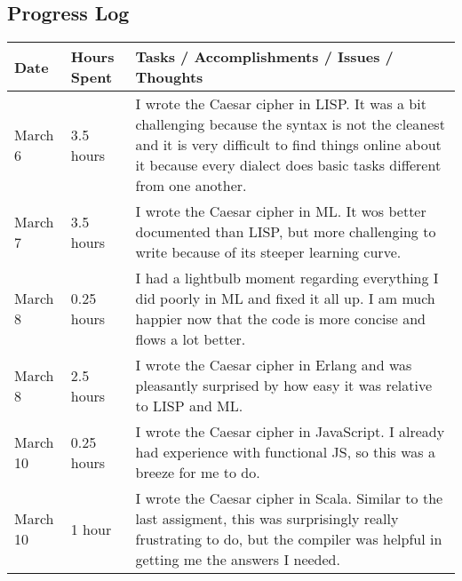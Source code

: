 \documentclass[letterpaper, 10pt, DIV=13]{scrartcl}
\numberwithin{equation}{section}
\numberwithin{figure}{section}
\numberwithin{table}{section}
\begin{document}
\subsection{Progress Log}
\begin{center}
	\begin{longtable}{|p{1in}|p{1in}|p{4in}|}
		\hline
		Date & Hours Spent & Tasks / Accomplishments / Issues / Thoughts
		\\
		\hline
        March 6 & 3.5 hours & I wrote the Caesar cipher in LISP. It was a bit challenging because the syntax is not the cleanest and it is very 
        difficult to find things online about it because every dialect does basic tasks different from one another.
        \\
		\hline
        March 7 & 3.5 hours & I wrote the Caesar cipher in ML. It wos better documented than LISP, but more challenging to write because of its 
        steeper learning curve.
        \\
        \hline
        March 8 & 0.25 hours & I had a lightbulb moment regarding everything I did poorly in ML and fixed it all up. I am much happier now that the code is
        more concise and flows a lot better.
        \\
        \hline
        March 8 & 2.5 hours & I wrote the Caesar cipher in Erlang and was pleasantly surprised by how easy it was relative to LISP and ML.
        \\
        \hline
        March 10 & 0.25 hours & I wrote the Caesar cipher in JavaScript. I already had experience with functional JS, so this was a breeze for me to do.
        \\
        \hline
        March 10 & 1 hour & I wrote the Caesar cipher in Scala. Similar to the last assigment, this was surprisingly really frustrating to do, but the compiler
        was helpful in getting me the answers I needed.
        \\
        \hline
	\end{longtable}
\end{center}
\end{document}
